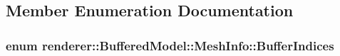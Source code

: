 \subsection{Member Enumeration Documentation}
\hypertarget{structrenderer_1_1BufferedModel_1_1MeshInfo_ae21111fafd86318119b109567aa3e045}{
\subsubsection[{Buffer\-Indices}]{\setlength{\rightskip}{0pt plus 5cm}enum {\bf renderer\-::\-Buffered\-Model\-::\-Mesh\-Info\-::\-Buffer\-Indices}}}\label{structrenderer_1_1BufferedModel_1_1MeshInfo_ae21111fafd86318119b109567aa3e045}
